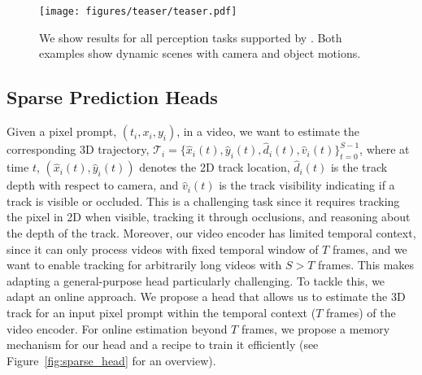 \begin{figure*}
    \captionsetup{skip=0pt}
    \begin{center}
    \texttt{[image: figures/teaser/teaser.pdf]}
    \end{center}
    \caption{
        We show results for all perception tasks supported by \methodName. 
        Both examples show dynamic scenes with camera and object motions.}\label{fig:all_in_one}
\end{figure*}

\subsection{Sparse Prediction Heads}\label{sec:method_sparse}

Given a pixel prompt, $(t_i,x_i,y_i)$, in a video, we want to estimate the corresponding 3D trajectory, $\mathcal{T}_i=\{\hat{x}_i(t),\hat{y}_i(t),\hat{d}_i(t),\hat{v}_i(t)\}_{t=0}^{S-1}$, where at time $t$, $(\hat{x}_i(t),\hat{y}_i(t))$ denotes the 2D track location, $\hat{d}_i(t)$ is the track depth with respect to camera, and $\hat{v}_i(t)$ is the track visibility indicating if a track is visible or occluded.
This is a challenging task since it requires tracking the pixel in 2D when visible, tracking it through occlusions, and reasoning about the depth of the track.
Moreover, our video encoder has limited temporal context, since it can only process videos with fixed temporal window of $T$ frames, and we want to enable tracking for arbitrarily long videos with $S>T$ frames.
This makes adapting a general-purpose head particularly challenging.
To tackle this, we adapt an online approach.
We propose a head that allows us to estimate the 3D track for an input pixel prompt within the temporal context ($T$ frames) of the video encoder.
For online estimation beyond $T$ frames, we propose a memory mechanism for our head and a recipe to train it efficiently (see Figure~\ref{fig:sparse_head} for an overview).

